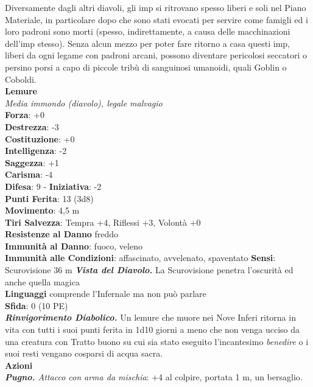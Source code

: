 \begin{multicols}{2}
Diversamente dagli altri diavoli, gli imp si ritrovano spesso liberi e soli nel Piano Materiale, in particolare dopo che sono stati evocati per servire come famigli ed i loro padroni sono morti (spesso, indirettamente, a causa delle macchinazioni dell'imp stesso). Senza alcun mezzo per poter fare ritorno a casa questi imp, liberi da ogni legame con padroni arcani, possono diventare pericolosi seccatori o persino porsi a capo di piccole tribù di sanguinosi umanoidi, quali Goblin o Coboldi.\\


\medskip\textbf{Lemure}\\
\emph{Media immondo (diavolo), legale malvagio}\\
\textbf{Forza}: +0\\
\textbf{Destrezza}: -3\\
\textbf{Costituzione}: +0\\
\textbf{Intelligenza}: -2\\
\textbf{Saggezza}: +1\\
\textbf{Carisma}: -4\\
\textbf{Difesa}: 9 - \textbf{Iniziativa}: -2\\
\textbf{Punti Ferita}: 13 (3d8)\\
\textbf{Movimento}: 4,5 m\\
\textbf{Tiri Salvezza}: Tempra +4, Riflessi +3, Volontà +0\\
\textbf{Resistenze al Danno} freddo\\
\textbf{Immunità al Danno}: fuoco, veleno\\
\textbf{Immunità alle Condizioni}: affascinato, avvelenato, spaventato
\textbf{Sensi}: Scurovisione 36 m
\emph{\textbf{Vista del Diavolo.}} La Scurovisione penetra l'oscurità ed anche quella magica\\
\textbf{Linguaggi} comprende l'Infernale ma non può parlare\\
\textbf{Sfida}: 0 (10 PE)\smallskip\\
\emph{\textbf{Rinvigorimento Diabolico.}} Un lemure che muore nei Nove Inferi ritorna in vita con tutti i suoi punti ferita in 1d10 giorni a meno che non venga ucciso da una creatura con Tratto buono su cui sia stato eseguito l'incantesimo \emph{benedire} o i suoi resti vengano cosparsi di acqua sacra.\\
\smallskip\textbf{Azioni} \\
\emph{\textbf{Pugno.} Attacco con arma da mischia}: +4 al colpire, portata 1 m, un bersaglio.\\

\end{multicols}
